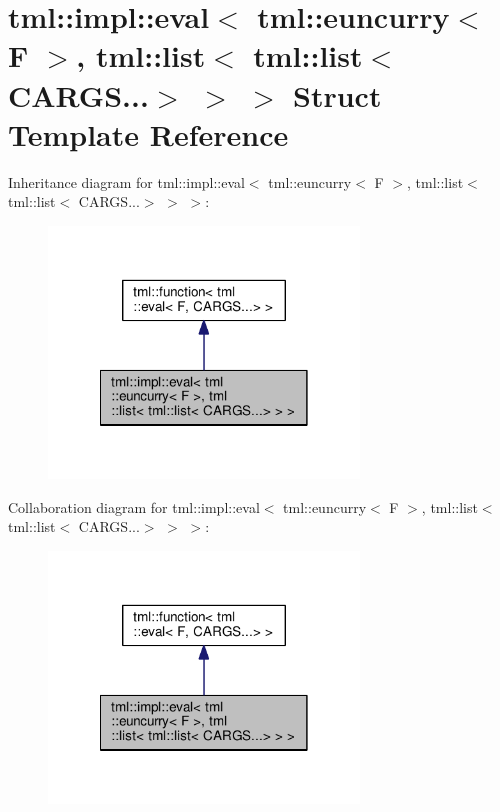 \hypertarget{structtml_1_1impl_1_1eval_3_01tml_1_1euncurry_3_01_f_01_4_00_01tml_1_1list_3_01tml_1_1list_3_01_c_a_r_g_s_8_8_8_4_01_4_01_4}{\section{tml\+:\+:impl\+:\+:eval$<$ tml\+:\+:euncurry$<$ F $>$, tml\+:\+:list$<$ tml\+:\+:list$<$ C\+A\+R\+G\+S...$>$ $>$ $>$ Struct Template Reference}
\label{structtml_1_1impl_1_1eval_3_01tml_1_1euncurry_3_01_f_01_4_00_01tml_1_1list_3_01tml_1_1list_3_01_c_a_r_g_s_8_8_8_4_01_4_01_4}
}


Inheritance diagram for tml\+:\+:impl\+:\+:eval$<$ tml\+:\+:euncurry$<$ F $>$, tml\+:\+:list$<$ tml\+:\+:list$<$ C\+A\+R\+G\+S...$>$ $>$ $>$\+:
\nopagebreak
\begin{figure}[H]
\begin{center}
\leavevmode
\includegraphics[width=234pt]{structtml_1_1impl_1_1eval_3_01tml_1_1euncurry_3_01_f_01_4_00_01tml_1_1list_3_01tml_1_1list_3_01_a7a6b3912f841c0ab983acedd6cf4486}
\end{center}
\end{figure}


Collaboration diagram for tml\+:\+:impl\+:\+:eval$<$ tml\+:\+:euncurry$<$ F $>$, tml\+:\+:list$<$ tml\+:\+:list$<$ C\+A\+R\+G\+S...$>$ $>$ $>$\+:
\nopagebreak
\begin{figure}[H]
\begin{center}
\leavevmode
\includegraphics[width=234pt]{structtml_1_1impl_1_1eval_3_01tml_1_1euncurry_3_01_f_01_4_00_01tml_1_1list_3_01tml_1_1list_3_01_ed1f1a97e427f7b862ff5e1b42b012ca}
\end{center}
\end{figure}
